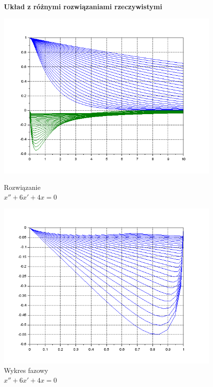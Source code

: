 \documentclass[12pt]{article}
\begin{document}
\begin{figure}[H]
  \centering
  \textbf{Układ z różnymi rozwiązaniami rzeczywistymi}\par\medskip
  \hspace{-1.6cm}
  \begin{minipage}[b]{0.49\textwidth}
    \includegraphics[scale=0.47]{./img/5-rzeczywiste-xy}
    \caption{Rozwiązanie \\ \centering$x''+6x'+4x=0$}
    \label{5-rzeczywiste-xy}
  \end{minipage}
  \hfill
  \begin{minipage}[b]{0.49\textwidth}
    \includegraphics[scale=0.47]{./img/5-rzeczywiste-phase}
    \caption{Wykres fazowy \\ \centering$x''+6x'+4x=0$}
    \label{5-rzeczywiste-phase}
  \end{minipage}
\end{figure}
\end{document}
